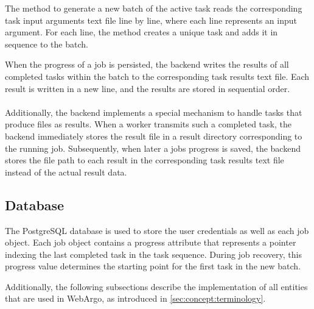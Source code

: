 The method to generate a new batch of the active task reads the corresponding task input arguments text file line by line, where each line represents an input argument. For each line, the method creates a unique task and adds it in sequence to the batch.

When the progress of a job is persisted, the backend writes the results of all completed tasks within the batch to the corresponding task results text file. Each result is written in a new line, and the results are stored in sequential order.
\\~\\
Additionally, the backend implements a special mechanism to handle tasks that produce files as results. When a worker transmits such a completed task, the backend immediately stores the result file in a result directory corresponding to the running job. Subsequently, when later a jobs progress is saved, the backend stores the file path to each result in the corresponding task results text file instead of the actual result data.

\subsection{Database}
The PostgreSQL \cite{methodology:db} database is used to store the user credentials as well as each job object. Each job object contains a progress attribute that represents a pointer indexing the last completed task in the task sequence. During job recovery, this progress value determines the starting point for the first task in the new batch.

Additionally, the following subsections describe the implementation of all entities that are used in WebArgo, as introduced in \autoref{sec:concept:terminology}.


